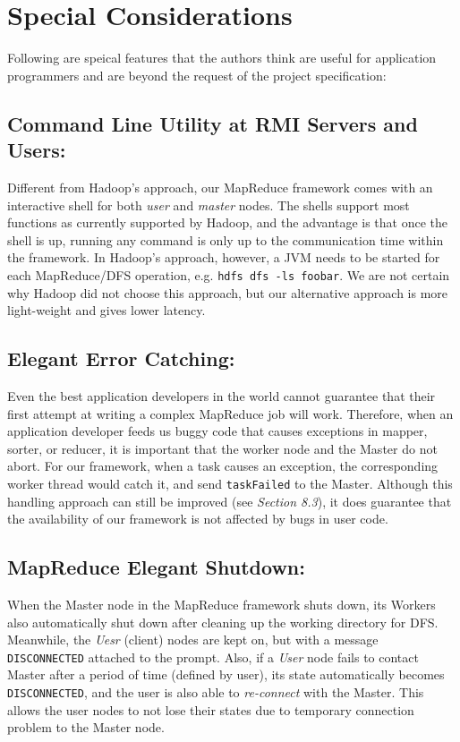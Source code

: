 \documentclass{article} %
\begin{document}
\section{Special Considerations}
\par\qquad Following are speical features that the authors think are useful for application programmers and are beyond the request of the project specification:

\subsection{Command Line Utility at RMI Servers and Users:}
    \par\qquad Different from Hadoop's approach, our MapReduce framework comes with an interactive shell for both \emph{user} and \emph{master} nodes. The shells support most functions as currently supported by Hadoop, and the advantage is that once the shell is up, running any command is only up to the communication time within the framework. In Hadoop's approach, however, a JVM needs to be started for each MapReduce/DFS operation, e.g. \texttt{hdfs dfs -ls foobar}. We are not certain why Hadoop did not choose this approach, but our alternative approach is more light-weight and gives lower latency.
\subsection{Elegant Error Catching:}
    \par\qquad Even the best application developers in the world cannot guarantee that their first attempt at writing a complex MapReduce job will work. Therefore, when an application developer feeds us buggy code that causes exceptions in mapper, sorter, or reducer, it is important that the worker node and the Master do not abort. For our framework, when a task causes an exception, the corresponding worker thread would catch it, and send \texttt{taskFailed} to the Master. Although this handling approach can still be improved (see \emph{Section 8.3}), it does guarantee that the availability of our framework is not affected by bugs in user code.
\subsection{MapReduce Elegant Shutdown:}
    \par\qquad When the Master node in the MapReduce framework shuts down, its Workers also automatically shut down after cleaning up the working directory for DFS. Meanwhile, the \emph{Uesr} (client) nodes are kept on, but with a message \texttt{DISCONNECTED} attached to the prompt. Also, if a \emph{User} node fails to contact Master after a period of time (defined by user), its state automatically becomes \texttt{DISCONNECTED}, and the user is also able to \emph{re-connect} with the Master. This allows the user nodes to not lose their states due to temporary connection problem to the Master node.
\end{document}
